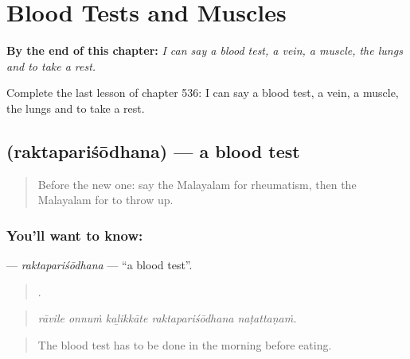 
\chapter{Blood Tests and Muscles}
\label{ch:ml-blood-tests-and-muscles}

\begin{chapteropening}
\textbf{By the end of this chapter:} \emph{I can say a blood test, a vein, a muscle, the lungs and to take a rest.}

Complete the last lesson of chapter 536: I can say a blood test, a vein, a muscle, the lungs and to take a rest.
\end{chapteropening}

\section[\texorpdfstring{\ml{രക്തപരിശോധന} (raktapariśōdhana)}{രക്തപരിശോധന (raktapariśōdhana)}]{ (raktapariśōdhana) — a blood test}

\label{lesson:ML-C536-raktaparisodhana}



\begin{quote}
Before the new one: say the Malayalam for rheumatism, then the Malayalam for to throw up.
\end{quote}

\subsection*{You'll want to know: }
\textbf{} — \emph{raktapariśōdhana} — \textquotedblleft{}a blood test\textquotedblright{}.

\begin{quote}
    .
\end{quote}

\begin{quote}
\emph{rāvile onnuṁ kaḻikkāte raktapariśōdhana naṭattaṇaṁ.}
\end{quote}

\begin{quote}
The blood test has to be done in the morning before eating.
\end{quote}


